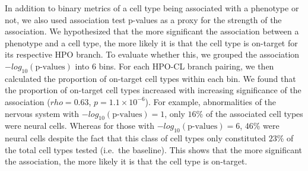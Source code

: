 \documentclass[
]{report}
\begin{document}
In addition to binary metrics of a cell type being associated with a
phenotype or not, we also used association test p-values as a proxy for
the strength of the association. We hypothesized that the more
significant the association between a phenotype and a cell type, the
more likely it is that the cell type is on-target for its respective HPO
branch. To evaluate whether this, we grouped the association
\(-log_{10}(\text{p-values})\) into 6 bins. For each HPO-CL branch
pairing, we then calculated the proportion of on-target cell types
within each bin. We found that the proportion of on-target cell types
increased with increasing significance of the association
(\(rho=\)\(0.63\), \(p=\)\(1.1 \times 10^{-6}\)). For example,
abnormalities of the nervous system with
\(-log_{10}(\text{p-values}) = 1\), only \(16\)\% of the associated cell
types were neural cells. Whereas for those with
\(-log_{10}(\text{p-values}) = 6\), \(46\)\% were neural cells despite
the fact that this class of cell types only constituted \(23\)\% of the
total cell types tested (i.e.~the baseline). This shows that the more
significant the association, the more likely it is that the cell type is
on-target.
\end{document}
